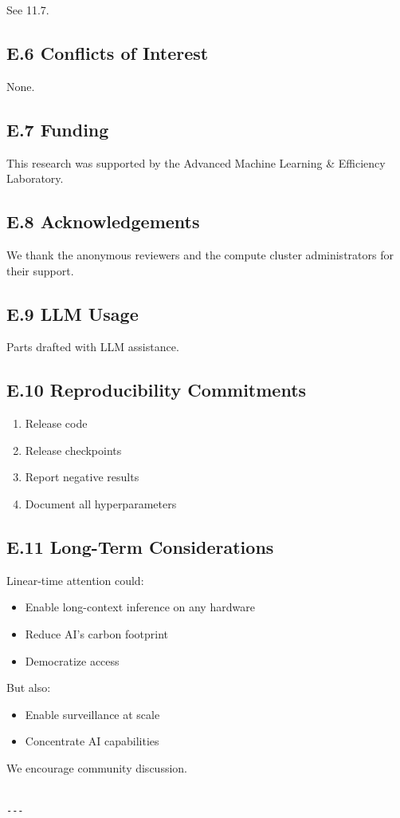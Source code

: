 See  11.7.

\subsection{E.6 Conflicts of Interest}

None.

\subsection{E.7 Funding}

This research was supported by the Advanced Machine Learning \& Efficiency Laboratory.

\subsection{E.8 Acknowledgements}

We thank the anonymous reviewers and the compute cluster administrators for their support.

\subsection{E.9 LLM Usage}

Parts drafted with LLM assistance.

\subsection{E.10 Reproducibility Commitments}

\begin{enumerate}
\item Release code
\item Release checkpoints
\item Report negative results
\item Document all hyperparameters

\end{enumerate}
\subsection{E.11 Long-Term Considerations}

Linear-time attention could:

\begin{itemize}
\item Enable long-context inference on any hardware
\item Reduce AI's carbon footprint
\item Democratize access

\end{itemize}
But also:

\begin{itemize}
\item Enable surveillance at scale
\item Concentrate AI capabilities

\end{itemize}
We encourage community discussion.
\begin{lstlisting}

---
\end{lstlisting}